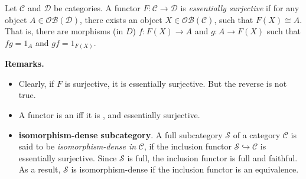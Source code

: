 \documentclass[12pt]{article}
\begin{document}

Let $\mathcal{C}$ and $\mathcal{D}$ be categories.  A functor $F\colon \mathcal{C}\to \mathcal{D}$ is \emph{essentially surjective} if for any object $A\in\mathcal{OB}(\mathcal{D})$, there exists an object $X\in\mathcal{OB}(\mathcal{C})$, such that $F(X)\cong A$.  That is, there are morphisms (in $D$) $f \colon F(X)\to A$ and $g\colon A\to F(X)$ such that $fg=1_A$ and $gf=1_{F(X)}$.

\textbf{Remarks.} 
\begin{itemize}
\item Clearly, if $F$ is surjective, it is essentially surjective.  But the reverse is not true.
\item A functor is an  iff it is ,  and essentially surjective.
\item \textbf{isomorphism-dense subcategory}.  A full subcategory $\mathcal{S}$ of a category $\mathcal{C}$ is said to be \emph{isomorphism-dense in} $\mathcal{C}$, if the inclusion functor $\mathcal{S}\hookrightarrow \mathcal{C}$ is essentially surjective.  Since $\mathcal{S}$ is full, the inclusion functor is full and faithful.  As a result, $\mathcal{S}$ is isomorphism-dense if the inclusion functor is an equivalence.
\end{itemize}
\end{document}
